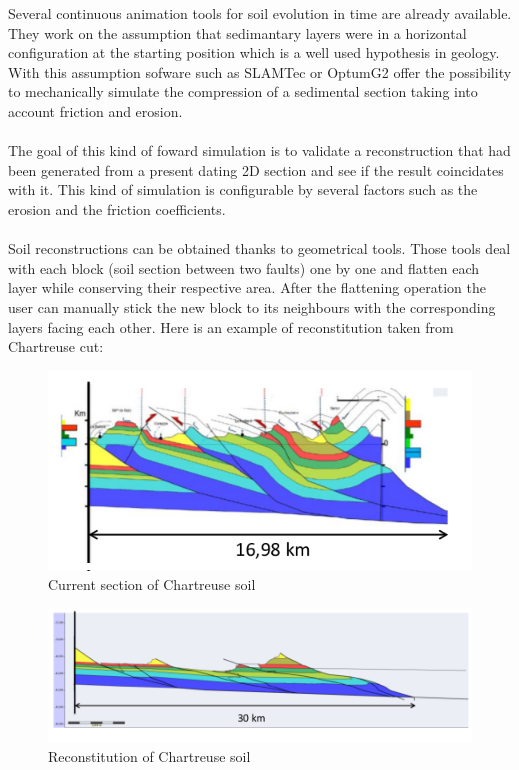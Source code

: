 \documentclass[a4paper,11pt]{article}
\begin{document}
Several continuous animation tools for soil evolution in time are already available.
They work on the assumption that sedimantary layers were in a horizontal configuration at the starting position which is a well used hypothesis in geology. 
With this assumption sofware such as SLAMTec or OptumG2 offer the possibility to mechanically simulate the compression of a sedimental section taking into account friction and erosion.\\\\
The goal of this kind of foward simulation is to validate a reconstruction that had been generated from a present dating 2D section and see if the result coincidates with it. This kind of simulation is configurable by several factors such as the erosion and the friction coefficients.\\\\
Soil reconstructions can be obtained thanks to geometrical tools. Those tools deal with each block (soil section between two faults) one by one and flatten each layer while conserving their respective area. After the flattening operation the user can manually stick the new block to its neighbours with the corresponding layers facing each other. 
Here is an example of reconstitution taken from Chartreuse cut:

\begin{figure}[H]
\centering
\includegraphics[scale=1]{Wraped_Section.png}
\caption{Current section of Chartreuse soil}
\end{figure}

\begin{figure}[H]
\centering
\includegraphics[scale=0.7]{UnWraped_Section.png}
\caption{Reconstitution of Chartreuse soil}
\end{figure}
\end{document}
